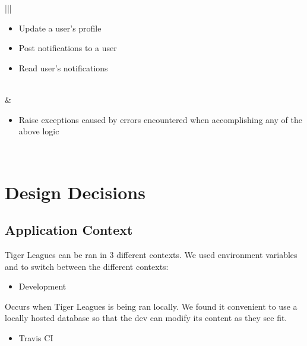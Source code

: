 \documentclass[letterpaper,10pt,english]{sphinxmanual}
\begin{document}
\begin{savenotes}
\begin{tabular}[t]{|*{2}{|}}
\begin{itemize}
\item {} 
Update a user’s profile

\item {} 
Post notifications to a user

\item {} 
Read user’s notifications

\end{itemize}
\\
\hline
{\hyperref[\detokenize{tiger_leagues/models/readme:module-tiger_leagues.models.exception}]{}}
&\begin{itemize}
\item {} 
Raise exceptions caused by errors encountered
when accomplishing any of the above logic

\end{itemize}
\\
\hline
\end{tabular}
\par
\sphinxattableend\end{savenotes}


\section{Design Decisions}
\label{\detokenize{tiger_leagues/models/readme:design-decisions}}\label{\detokenize{tiger_leagues/models/readme:models-design-decisions}}

\subsection{Application Context}
\label{\detokenize{tiger_leagues/models/readme:application-context}}\label{\detokenize{tiger_leagues/models/readme:id1}}
Tiger Leagues can be ran in 3 different contexts. We used environment
variables and {\hyperref[\detokenize{tiger_leagues/models/readme:module-tiger_leagues.models.config}]{}} to switch between the
different contexts:
\begin{itemize}
\item {} 
Development

\end{itemize}

Occurs when Tiger Leagues is being ran locally. We found it convenient to use
a locally hosted database so that the dev can modify its content as they see
fit.
\begin{itemize}
\item {} 
Travis CI

\end{itemize}
\end{document}
